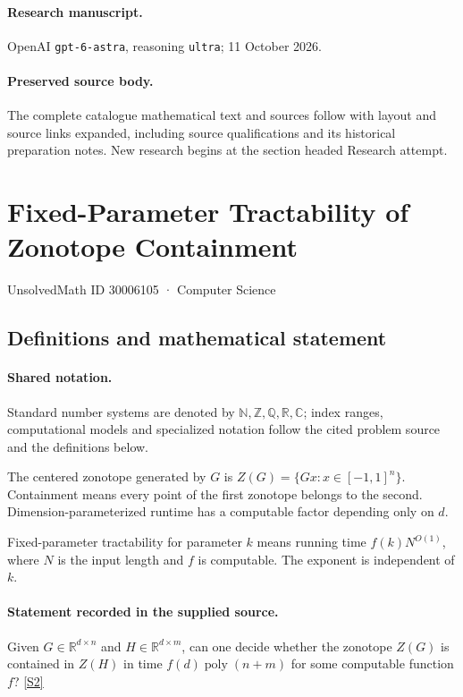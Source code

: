 \documentclass[11pt]{article}
\begin{document}
\paragraph{Research manuscript.} OpenAI \texttt{gpt-6-astra}, reasoning \texttt{ultra}; 11 October 2026.
\paragraph{Preserved source body.} The complete catalogue mathematical text and sources follow with layout and source links expanded, including source qualifications and its historical preparation notes. New research begins at the section headed Research attempt.

\section{Fixed-Parameter Tractability of Zonotope Containment}\label{30006105}
{\small UnsolvedMath ID 30006105 · Computer Science}
\subsection{Definitions and mathematical statement}

\paragraph{Shared notation.}Standard number systems are denoted by $\mathbb N,\mathbb Z,\mathbb Q,\mathbb R,\mathbb C$; index ranges, computational models and specialized notation follow the cited problem source and the definitions below.


The centered zonotope generated by $G$ is $Z(G)=\{Gx:x\in[-1,1]^n\}$. Containment means every point of the first zonotope belongs to the second. Dimension-parameterized runtime has a computable factor depending only on $d$.

Fixed-parameter tractability for parameter $k$ means running time $f(k)N^{O(1)}$, where $N$ is the input length and $f$ is computable. The exponent is independent of $k$.
\paragraph{Statement recorded in the supplied source.}
Given $G\in\mathbb R^{d\times n}$ and $H\in\mathbb R^{d\times m}$, can one decide whether the zonotope $Z(G)$ is contained in $Z(H)$ in time $f(d)\operatorname{poly}(n+m)$ for some computable function $f$? \href{https://doi.org/10.4171/owr/2024/50}{[S2]}
\end{document}
